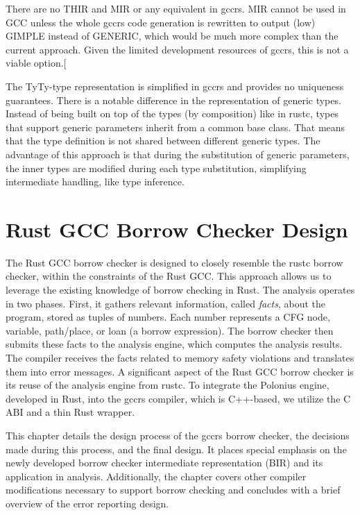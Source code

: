 \documentclass[
  11pt,
  twoside]{report}
\begin{document}
There are no THIR and MIR or any equivalent in gccrs. MIR cannot be used
in GCC unless the whole gccrs code generation is rewritten to output
(low) GIMPLE instead of GENERIC, which would be much more complex than
the current approach. Given the limited development resources of gccrs,
this is not a viable option.{[}\citeproc{ref-zulip}{15}{]}

The TyTy-type representation is simplified in gccrs and provides no
uniqueness guarantees. There is a notable difference in the
representation of generic types. Instead of being built on top of the
types (by composition) like in rustc, types that support generic
parameters inherit from a common base class. That means that the type
definition is not shared between different generic types. The advantage
of this approach is that during the substitution of generic parameters,
the inner types are modified during each type substitution, simplifying
intermediate handling, like type inference.

\chapter{Rust GCC Borrow Checker
Design}\label{sec:rust-gcc-borrow-checker-design}

The Rust GCC borrow checker is designed to closely resemble the rustc
borrow checker, within the constraints of the Rust GCC. This approach
allows us to leverage the existing knowledge of borrow checking in Rust.
The analysis operates in two phases. First, it gathers relevant
information, called \emph{facts}, about the program, stored as tuples of
numbers. Each number represents a CFG node, variable, path/place, or
loan (a borrow expression). The borrow checker then submits these facts
to the analysis engine, which computes the analysis results. The
compiler receives the facts related to memory safety violations and
translates them into error messages. A significant aspect of the Rust
GCC borrow checker is its reuse of the analysis engine from rustc. To
integrate the Polonius engine, developed in Rust, into the gccrs
compiler, which is C++-based, we utilize the C ABI and a thin Rust
wrapper.

This chapter details the design process of the gccrs borrow checker, the
decisions made during this process, and the final design. It places
special emphasis on the newly developed borrow checker intermediate
representation (BIR) and its application in analysis. Additionally, the
chapter covers other compiler modifications necessary to support borrow
checking and concludes with a brief overview of the error reporting
design.
\end{document}
